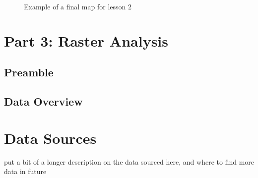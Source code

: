 \documentclass{article}
\begin{document}
\begin{figure}[h]
  \centering
  \caption{Example of a final map for lesson 2}
  \label{2_map}
\end{figure}

\pagebreak
\section{Part 3: Raster Analysis}
\subsection{Preamble}
\subsection{Data Overview}

\section{Data Sources}
put a bit of a longer description on the data sourced here, and where to find more data in future
\end{document}
